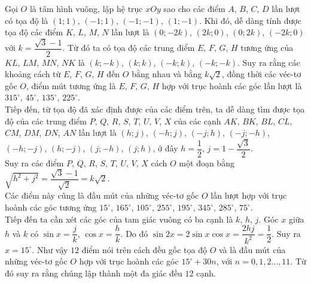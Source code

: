 \begin{bt}[Iran, 2001]
{		Gọi $O$ là tâm hình vuông, lập hệ trục $xOy$ sao cho các điểm $A$, $B$, $C$, $D$  lần lượt có tọa độ là $ (1;1) $, $ (-1;1) $, $ (-1;-1) $, $ (1;-1) $. Khi đó, dễ dàng tính được tọa độ các điểm $ K $, $ L $, $ M $, $ N $ lần lượt là $ (0;-2k) $, $ (2k;0) $, $ (0;2k) $, $ (-2k;0) $ với $ k=\dfrac{\sqrt{3}-1}{2} $. Từ đó ta có tọa độ các trung điểm $ E $, $ F $, $ G $, $ H $ tương ứng của $ KL $, $ LM $, $ MN $, $ NK $ là $ (k;-k) $, $ (k;k) $, $ (-k;k) $, $ (-k;-k) $. Suy ra rằng các khoảng cách từ $ E $, $ F $, $ G $, $ H $ đến $ O $ bằng nhau và bằng $ k\sqrt{2} $, đồng thời các véc-tơ gốc $ O $, điểm mút tương ứng là $ E $, $ F $, $ G $, $ H $ hợp với trục hoành các góc lần lượt là $ 315^\circ $, $ 45^\circ $, $ 135^\circ $, $ 225^\circ $.\\ Tiếp đến, từ tọa độ đã xác định được của các điểm trên, ta dễ dàng tìm được tọa độ của các trung điểm $ P $, $ Q $, $ R $, $ S $, $ T $, $ U $, $ V $, $ X $ của các cạnh $ AK $, $ BK $, $ BL $, $ CL $, $ CM $, $ DM $, $ DN $, $ AN $ lần lượt là $ (h;j) $, $ (-h;j) $, $ (-j;h) $, $ (-j;-h) $, $ (-h;-j) $, $ (h;-j) $, $ (j;-h) $, $ (j;h) $, ở đây $ h=\dfrac{1}{2} $, $ j=1-\dfrac{\sqrt{3}}{2} $.\\ Suy ra các điểm $ P $, $ Q $, $ R $, $ S $, $ T $, $ U $, $ V $, $ X $ cách $ O $ một đoạn bằng $ \sqrt{h^2+j^2}=\dfrac{\sqrt{3}-1}{\sqrt{2}} =k\sqrt{2}$.\\ Các điểm này cũng là đầu mút của những véc-tơ gốc $ O $ lần lượt hợp với trục hoành các góc tương ứng $ 15^\circ $, $ 165^\circ $, $ 105^\circ $, $ 255^\circ $, $ 195^\circ $, $ 345^\circ $, $ 285^\circ $, $ 75^\circ $. \\ Tiếp đến ta cần xét các góc của tam giác vuông có ba cạnh là $ k $, $ h $, $ j $. Góc $ x $ giữa $ h $ và $ k $ có $ \sin x=\dfrac{j}{k} $, $ \cos x=\dfrac{h}{k} $. Do đó $ \sin 2x=2\sin x\cos x=\dfrac{2hj}{k^2} =\dfrac{1}{2}$. Suy ra $ x=15^\circ $. Như vậy $ 12 $ điểm nói trên cách đều gốc tọa độ $ O$ và là đầu mút của những véc-tơ gốc $ O $ hợp với trục hoành các góc $ 15^\circ+30n $, với $ n=0,1,2\ldots ,11 $. Từ đó suy ra rằng chúng lập thành một đa giác đều $ 12 $ cạnh.}
\end{bt}


